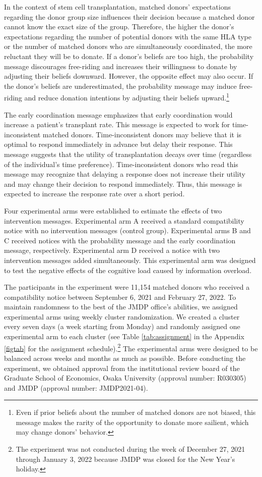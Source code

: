 \documentclass[12pt, a4paper]{article}
\begin{document}
In the context of stem cell transplantation, matched donors' expectations regarding the donor group size influences their decision because a matched donor cannot know the exact size of the group. Therefore, the higher the donor's expectations regarding the number of potential donors with the same HLA type or the number of matched donors who are simultaneously coordinated, the more reluctant they will be to donate. If a donor's beliefs are too high, the probability message discourages free-riding and increases their willingness to donate by adjusting their beliefs downward. However, the opposite effect may also occur. If the donor's beliefs are underestimated, the probability message may induce free-riding and reduce donation intentions by adjusting their beliefs upward.\footnote{Even if prior beliefs about the number of matched donors are not biased, this message makes the rarity of the opportunity to donate more sailient, which may change donors' behavior.}

The early coordination message emphasizes that early coordination would increase a patient's transplant rate. This message is expected to work for time-inconsistent matched donors. Time-inconsistent donors may believe that it is optimal to respond immediately in advance but delay their response. This message suggests that the utility of transplantation decays over time (regardless of the individual's time preference). Time-inconsistent donors who read this message may recognize that delaying a response does not increase their utility and may change their decision to respond immediately. Thus, this message is expected to increase the response rate over a short period.

Four experimental arms were established to estimate the effects of two intervention messages. Experimental arm A received a standard compatibility notice with no intervention messages (control group). Experimental arms B and C received notices with the probability message and the early coordination message, respectively. Experimental arm D received a notice with two intervention messages added simultaneously. This experimental arm was designed to test the negative effects of the cognitive load caused by information overload.

The participants in the experiment were 11,154 matched donors who received a compatibility notice between September 6, 2021 and February 27, 2022. To maintain randomness to the best of the JMDP office's abilities, we assigned experimental arms using weekly cluster randomization. We created a cluster every seven days (a week starting from Monday) and randomly assigned one experimental arm to each cluster (see Table \ref{tab:assignment} in the Appendix \ref{figtab} for the assignment schedule).\footnote{The experiment was not conducted during the week of December 27, 2021 through January 3, 2022 because JMDP was closed for the New Year's holiday.} The experimental arms were designed to be balanced across weeks and months as much as possible. Before conducting the experiment, we obtained approval from the institutional review board of the Graduate School of Economics, Osaka University (approval number: R030305) and JMDP (approval number: JMDP2021-04).
\end{document}
